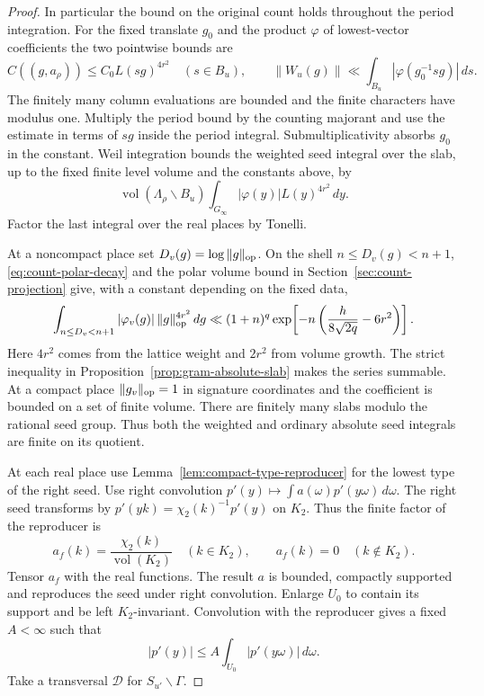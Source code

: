 \begin{proof}
In particular the bound on the original count holds throughout the
period integration. For the fixed translate \(g_0\) and the product
\(\varphi\) of lowest-vector coefficients the two pointwise bounds are
\[
 C((g,a_\rho))\le C_0L(sg)^{4r^2}\quad(s\in B_u),\qquad
 \|W_u(g)\|\ll \int_{B_u}|\varphi(g_0^{-1}sg)|\,ds .
\]
The finitely many column evaluations are bounded and the finite
characters have modulus one. Multiply the period bound by the
counting majorant and use the estimate in terms of \(sg\) inside
the period integral. Submultiplicativity absorbs \(g_0\) in the
constant. Weil integration bounds the weighted seed integral over
the slab, up to the fixed finite level volume and the constants
above, by
\[
 \operatorname{vol}(\Lambda_\rho\backslash B_u)
       \int_{G_\infty}|\varphi(y)|L(y)^{4r^2}\,dy .
\]
Factor the last integral over the real places by Tonelli.

At a noncompact place set \(D_v(g)=\log\|g\|_{\rm op}\).
On the shell \(n\le D_v(g)<n+1\), \eqref{eq:count-polar-decay}
and the polar volume bound in Section~\ref{sec:count-projection}
give, with a constant depending on the fixed data,
\[
 \int_{n\le D_v<n+1}|\varphi_v(g)|\,\|g\|_{\rm op}^{4r^2}\,dg
 \ll (1+n)^q
      \exp\!\left[-n\left(\frac{h}{8\sqrt{2q}}-6r^2\right)\right].
\]
Here \(4r^2\) comes from the lattice weight and \(2r^2\) from
volume growth. The strict inequality in Proposition~\ref{prop:gram-absolute-slab}
makes the series summable. At a compact place \(\|g_v\|_{\rm op}=1\) in
signature coordinates and the coefficient is bounded on a set of
finite volume.
There are finitely many slabs modulo the rational seed group.
Thus both the weighted and ordinary absolute seed integrals
are finite on its quotient.

At each real place use Lemma~\ref{lem:compact-type-reproducer}
for the lowest type of the right seed. Use right convolution \(p'(y)\mapsto\int a(\omega)p'(y\omega)\,d\omega\).
The right seed transforms by \(p'(yk)=\chi_2(k)^{-1}p'(y)\) on \(K_2\).
Thus the finite factor of the reproducer is
\[
 a_f(k)=\frac{\chi_2(k)}{\operatorname{vol}(K_2)}
      \quad(k\in K_2),\qquad a_f(k)=0\quad(k\notin K_2).
\]
Tensor \(a_f\) with the real functions. The result
\(a\) is bounded, compactly supported and reproduces the seed
under right convolution. Enlarge \(U_0\) to contain its support and
be left \(K_2\)-invariant. Convolution with the reproducer gives a fixed \(A<\infty\) such that
\[
 |p'(y)|\le A\int_{U_0}|p'(y\omega)|\,d\omega .
\]
Take a transversal \(\mathcal D\) for \(S_{u'}\backslash\Gamma\).


\end{proof}
